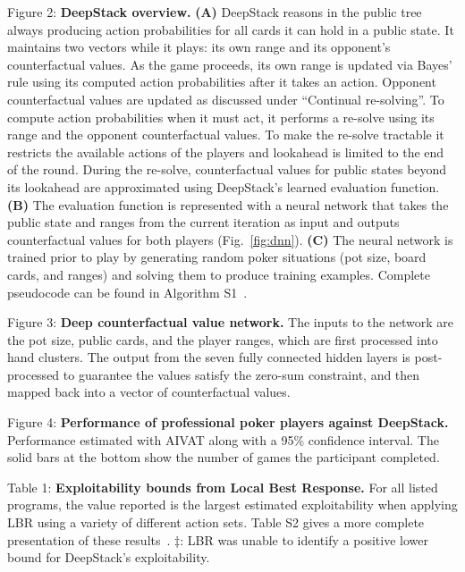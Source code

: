 \documentclass[12pt]{article}
\newif\ifarxiv
\begin{document}
\noindent 
Figure 2: 
{\bf DeepStack overview.} 
{\bf (A)} DeepStack reasons in the public tree always producing action probabilities for all cards it can hold in a public state.  It maintains two vectors while it plays: its own range and its opponent's counterfactual values.  As the game proceeds, its own range is updated via Bayes' rule using its computed action probabilities after it takes an action.  Opponent counterfactual values are updated as discussed under ``Continual re-solving''.  To compute action probabilities when it must act, it performs a re-solve using its range and the opponent counterfactual values.  To make the re-solve tractable it restricts the available actions of the players and lookahead is limited to the end of the round.
During the re-solve, counterfactual values for public states beyond its lookahead are approximated using DeepStack's learned evaluation function.  {\bf (B)} The evaluation function is represented with a neural network that takes the public state and ranges from the current iteration as input and outputs counterfactual values for both players (Fig.~\ref{fig:dnn}).  {\bf (C)} The neural network is trained prior to play by generating random poker situations (pot size, board cards, and ranges) and solving them to produce training examples.  Complete pseudocode can be found in Algorithm S1~\cite{SOM}.%
\bigskip

\noindent 
Figure 3:
{\bf Deep counterfactual value network.}  The inputs to the network are the pot size, public cards, and the player ranges, which are first processed into hand clusters.  The output from the seven fully connected hidden layers is post-processed to guarantee the values satisfy the zero-sum constraint, and then mapped back into a vector of counterfactual values.
\bigskip

\noindent 
Figure 4:
{\bf Performance of professional poker players against DeepStack.}  Performance estimated with AIVAT along with a 95\% confidence interval. The solid bars at the bottom show the number of games the participant completed.
\bigskip

\noindent
Table 1:
{\bf Exploitability bounds from Local Best Response.}  For all listed programs, the value reported is the largest estimated exploitability when applying LBR using a variety of different action sets.  Table S2 gives a more complete presentation of these results~\cite{SOM}.  $\ddagger$: LBR was unable to identify a positive lower bound for DeepStack's exploitability.%
\fi 

\ifarxiv
\clearpage
\begin{center}
{\LARGE\baselineskip24pt 
Supplementary Materials for \\
{\large DeepStack: Expert-Level AI in No-Limit Poker}
\par\bigskip\bigskip\bigskip
}
\end{center}


\fi
\end{document}
